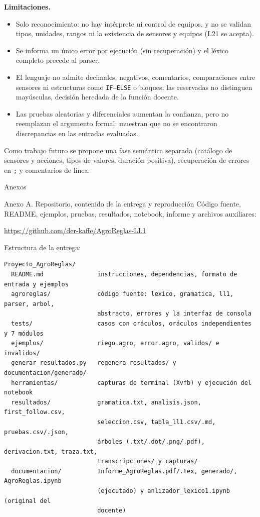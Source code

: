 \documentclass[11pt,letterpaper]{article}
\makeatletter
\renewcommand\section{\@startsection{section}{1}{\z@}{-3.2ex \@plus -1ex \@minus -.2ex}{1.6ex \@plus .2ex}%
  {\normalfont\Large\bfseries\color{acento}}}
\renewcommand\subsection{\@startsection{subsection}{2}{\z@}{-2.6ex\@plus -1ex \@minus -.2ex}{1.0ex \@plus .2ex}%
  {\normalfont\large\bfseries}}
\newcommand{\T}[1]{\texttt{#1}}
\newenvironment{codigo}{\par\small\vspace{2pt}}{\par\vspace{2pt}}
\makeatother
\begin{document}
\textbf{Limitaciones.}
\begin{itemize}
\item Solo reconocimiento: no hay intérprete ni control de equipos, y no se validan tipos, unidades, rangos ni la
existencia de sensores y equipos (L21 se acepta).
\item Se informa un único error por ejecución (sin recuperación) y el léxico completo precede al parser.
\item El lenguaje no admite decimales, negativos, comentarios, comparaciones entre sensores ni estructuras como
\T{IF--ELSE} o bloques; las reservadas no distinguen mayúsculas, decisión heredada de la función docente.
\item Las pruebas aleatorias y diferenciales aumentan la confianza, pero no reemplazan el argumento formal: muestran
que no se encontraron discrepancias en las entradas evaluadas.
\end{itemize}
Como trabajo futuro se propone una fase semántica separada (catálogo de sensores y acciones, tipos de valores, duración
positiva), recuperación de errores en \T{;} y comentarios de línea.

\clearpage
\section{Anexos}\label{sec:anexos}

\subsection{Anexo A. Repositorio, contenido de la entrega y reproducción}\label{sec:repositorio}
Código fuente, README, ejemplos, pruebas, resultados, notebook, informe y archivos auxiliares:
\begin{center}\url{https://github.com/der-kaffe/AgroReglas-LL1}\end{center}
Estructura de la entrega:

\begin{codigo}
\begin{verbatim}
Proyecto_AgroReglas/
  README.md               instrucciones, dependencias, formato de entrada y ejemplos
  agroreglas/             código fuente: lexico, gramatica, ll1, parser, arbol,
                          abstracto, errores y la interfaz de consola
  tests/                  casos con oráculos, oráculos independientes y 7 módulos
  ejemplos/               riego.agro, error.agro, validos/ e invalidos/
  generar_resultados.py   regenera resultados/ y documentacion/generado/
  herramientas/           capturas de terminal (Xvfb) y ejecución del notebook
  resultados/             gramatica.txt, analisis.json, first_follow.csv,
                          seleccion.csv, tabla_ll1.csv/.md, pruebas.csv/.json,
                          árboles (.txt/.dot/.png/.pdf), derivacion.txt, traza.txt,
                          transcripciones/ y capturas/
  documentacion/          Informe_AgroReglas.pdf/.tex, generado/, AgroReglas.ipynb
                          (ejecutado) y anlizador_lexico1.ipynb (original del
                          docente)
\end{verbatim}
\end{codigo}
\end{document}
